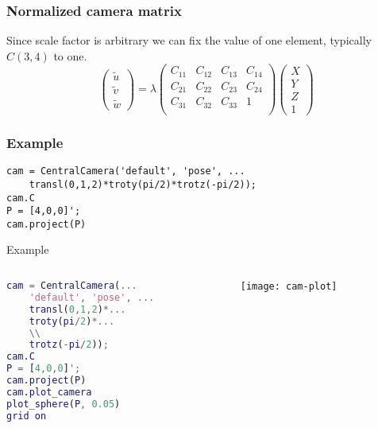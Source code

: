 \begin{frame}
\frametitle{Normalized camera matrix}
Since scale factor is arbitrary we can fix the value of one element, typically $C(3,4)$ to one.
\[
\left (
\begin{array}{c}
\tilde{u} \\
\tilde{v} \\
\tilde{w}
\end{array}
\right )
=
\lambda
\left (
\begin{array}{cccc}
C_{11} & C_{12} & C_{13} & C_{14} \\
C_{21} & C_{22} & C_{23} & C_{24} \\
C_{31} & C_{32} & C_{33} & 1 \\
\end{array}
\right )
\left (
\begin{array}{c}
X \\
Y \\
Z \\
1
\end{array}
\right )
\]
\end{frame}

\begin{frame}[fragile]
\frametitle{Example}
\begin{lstlisting}
cam = CentralCamera('default', 'pose', ...
    transl(0,1,2)*troty(pi/2)*trotz(-pi/2));
cam.C
P = [4,0,0]';
cam.project(P)
\end{lstlisting}
\end{frame}

\begin{frame}[fragile]
Example
\begin{columns}
\begin{column}{.5\textwidth}
\begin{lstlisting}[language=Matlab]
%%
cam = CentralCamera(...
	'default', 'pose', ...
    transl(0,1,2)*...
    troty(pi/2)*...
    \\
    trotz(-pi/2));
cam.C
P = [4,0,0]';
cam.project(P)
cam.plot_camera
plot_sphere(P, 0.05)
grid on
\end{lstlisting}
\end{column}
\begin{column}{.5\textwidth}
\begin{figure}[!h]
\centering
\texttt{[image: cam-plot]}
\end{figure}
\end{column}
\end{columns}
\end{frame}

